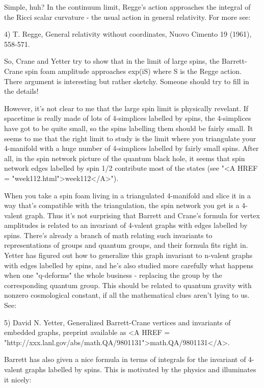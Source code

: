 Simple, huh?  In the continuum limit, Regge's action approaches the
integral of the Ricci scalar curvature - the usual action in general
relativity.  For more see:

4) T. Regge, General relativity without coordinates, Nuovo Cimento 19
(1961), 558-571.

So, Crane and Yetter try to show that in the limit of large spins, the
Barrett-Crane spin foam amplitude approaches exp(iS) where S is the
Regge action.  There argument is interesting but rather sketchy.
Someone should try to fill in the details!

However, it's not clear to me that the large spin limit is physically
revelant.  If spacetime is really made of lots of 4-simplices labelled
by spins, the 4-simplices have got to be quite small, so the spins
labelling them should be fairly small.  It seems to me that the right
limit to study is the limit where you triangulate your 4-manifold with
a huge number of 4-simplices labelled by fairly small spins.  After
all, in the spin network picture of the quantum black hole, it seems
that spin network edges labelled by spin 1/2 contribute most of the
states (see "<A HREF = "week112.html">week112</A>").  

When you take a spin foam living in a triangulated 4-manifold and
slice it in a way that's compatible with the triangulation, the spin
network you get is a 4-valent graph.  Thus it's not surprising that
Barrett and Crane's formula for vertex amplitudes is related to an
invariant of 4-valent graphs with edges labelled by spins.  There's
already a branch of math relating such invariants to representations
of groups and quantum groups, and their formula fits right in.  Yetter
has figured out how to generalize this graph invariant to n-valent
graphs with edges labelled by spins, and he's also studied more
carefully what happens when one "q-deforms" the whole business -
replacing the group by the corresponding quantum group.  This should
be related to quantum gravity with nonzero cosmological constant, if
all the mathematical clues aren't lying to us.  See:

5) David N. Yetter, Generalized Barrett-Crane vertices and invariants of 
embedded graphs, preprint available as <A HREF = "http://xxx.lanl.gov/abs/math.QA/9801131">math.QA/9801131</A>.

Barrett has also given a nice formula in terms of integrals for
the invariant of 4-valent graphs labelled by spins.  This is motivated
by the physics and illuminates it nicely:

